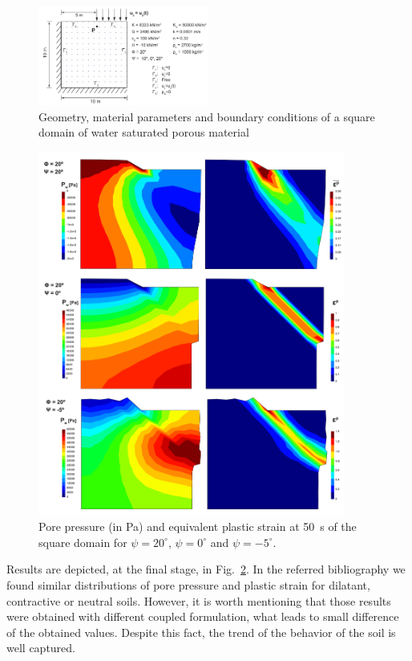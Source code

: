 \documentclass[twocolumn]{svjour3}          %
\begin{document}
\begin{figure}
  \includegraphics[width=0.5\textwidth]{Fig/geo_zap.pdf}
\caption{Geometry, material parameters and boundary conditions of a square domain of water saturated porous material}
\label{fig:7}      
\end{figure}

\begin{figure}
\centering
  \includegraphics[width=0.9\textwidth]{Fig/vertical_cut.pdf}
\caption{Pore pressure (in Pa) and equivalent plastic strain at 50~s of the square domain for $\psi=20^\circ$, $\psi=0^\circ$ and $\psi=-5^\circ$.}
\label{fig:8}      
\end{figure}

Results are depicted, at the final stage, in Fig.~\ref{fig:8}. In the referred bibliography we found similar distributions of pore pressure and plastic strain for dilatant, contractive or neutral soils. However, it is worth mentioning that those results were obtained with different coupled formulation, what leads to small difference of the obtained values. Despite this fact, the trend of the behavior of the soil is well captured. 
\end{document}
